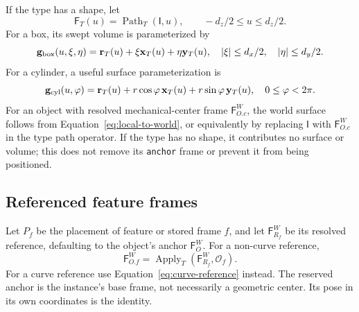 \documentclass[11pt,a4paper]{article}
\newcommand{\Frame}{\mathsf{F}}
\newcommand{\Apply}{\operatorname{Apply}}
\newcommand{\Path}{\operatorname{Path}}
\newcommand{\ops}{\mathcal{O}}
\newcommand{\identity}{\mathsf{I}}
\begin{document}
If the type has a shape, let
\begin{equation}
  \Frame_T(u)=\Path_T(\identity,u),
  \qquad -d_z/2\le u\le d_z/2.
\end{equation}
For a box, its swept volume is parameterized by
\begin{equation}
  \mathbf{g}_{\rm box}(u,\xi,\eta)
  =\mathbf{r}_T(u)+\xi\mathbf{x}_T(u)+\eta\mathbf{y}_T(u),
  \quad
  |\xi|\le d_x/2,\quad |\eta|\le d_y/2.
  \label{eq:box-sweep}
\end{equation}
For a cylinder, a useful surface parameterization is
\begin{equation}
  \mathbf{g}_{\rm cyl}(u,\varphi)
  =\mathbf{r}_T(u)
   +r\cos\varphi\,\mathbf{x}_T(u)
   +r\sin\varphi\,\mathbf{y}_T(u),
  \quad 0\le\varphi<2\pi.
  \label{eq:cylinder-sweep}
\end{equation}
For an object with resolved mechanical-center frame $\Frame_{O.c}^W$, the world surface follows
from Equation~\eqref{eq:local-to-world}, or equivalently by replacing
$\identity$ with $\Frame_{O.c}^W$ in the type path operator.
If the type has no shape, it contributes no surface or volume; this does not
remove its \texttt{anchor} frame or prevent it from being positioned.

\subsection{Referenced feature frames}

Let $P_f$ be the placement of feature or stored frame $f$, and let
$\Frame_{R_f}^W$ be its resolved reference, defaulting to the object's anchor
$\Frame_O^W$. For a non-curve reference,
\begin{equation}
  \Frame_{O.f}^W=\Apply_T(\Frame_{R_f}^W,\ops_f).
  \label{eq:named-local-frame}
\end{equation}
For a curve reference use Equation~\eqref{eq:curve-reference} instead.
The reserved anchor is the instance's base frame, not necessarily a geometric
center. Its pose in its own coordinates is the identity.
\end{document}
